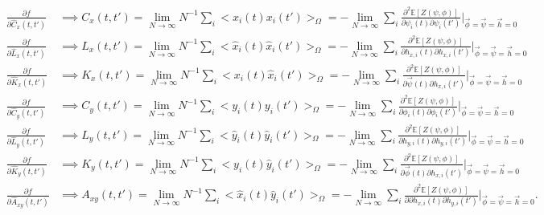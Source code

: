 \documentclass{article}
\begin{document}
\begin{align*}
	\frac{\partial f}{\partial \hat{C}_x(t, t')} &\implies C_x(t, t') = \lim_{N \rightarrow \infty}
N^{-1} \sum_i <x_i(t) x_i(t')>_\Omega = -\lim_{N \rightarrow \infty} \sum_i
\frac{\partial^2\mathbb{E}[Z(\psi, \phi)]}{\partial \psi_i(t) \partial \psi_i (t')} \bigg|_{\Vec
{\phi} = \Vec{\psi} = \Vec{h} = 0}\\
	\frac{\partial f}{\partial \hat{L}_x(t, t')} &\implies L_x(t, t') = \lim_{N \rightarrow \infty}
N^{-1} \sum_i <\hat{x}_i(t) \hat{x}_i(t')>_\Omega = -\lim_{N \rightarrow \infty} \sum_i
\frac{\partial^2\mathbb{E}[Z(\psi, \phi)]}{\partial h_{x,i}(t) \partial h_{x, i} (t')} \bigg|_{\Vec
{\phi} = \Vec{\psi} = \Vec{h} = 0}\\
	\frac{\partial f}{\partial \hat{K}_x(t, t')} &\implies K_x(t, t') = \lim_{N \rightarrow \infty}
N^{-1} \sum_i <x_i(t) \hat{x}_i(t')>_\Omega = -\lim_{N \rightarrow \infty} \sum_i
\frac{\partial^2\mathbb{E}[Z(\psi, \phi)]}{\partial \Vec{\psi}(t) \partial h_{x, i} (t')}
\bigg|_{\Vec{\phi} = \Vec{\psi} = \Vec{h} = 0}\\
\frac{\partial f}{\partial \hat{C}_y(t, t')} &\implies C_y(t, t') = \lim_{N \rightarrow \infty}
N^{-1} \sum_i <y_i(t) y_i(t')>_\Omega = -\lim_{N \rightarrow \infty} \sum_i
\frac{\partial^2\mathbb{E}[Z(\psi, \phi)]}{\partial \phi_i(t) \partial \phi_i (t')} \bigg|_{\Vec
{\phi} = \Vec{\psi} = \Vec{h} = 0}\\
	\frac{\partial f}{\partial \hat{L}_y(t, t')} &\implies L_y(t, t') = \lim_{N \rightarrow \infty}
N^{-1} \sum_i <\hat{y}_i(t) \hat{y}_i(t')>_\Omega = -\lim_{N \rightarrow \infty} \sum_i
\frac{\partial^2\mathbb{E}[Z(\psi, \phi)]}{\partial h_{y,i}(t) \partial h_{y, i} (t')} \bigg|_{\Vec
{\phi} = \Vec{\psi} = \Vec{h} = 0}\\
	\frac{\partial f}{\partial \hat{K}_y(t, t')} &\implies K_y(t, t') = \lim_{N \rightarrow \infty}
N^{-1} \sum_i <y_i(t) \hat{y}_i(t')>_\Omega = -\lim_{N \rightarrow \infty} \sum_i
\frac{\partial^2\mathbb{E}[Z(\psi, \phi)]}{\partial \Vec{\phi}(t) \partial h_{x, i} (t')}
\bigg|_{\Vec{\phi} = \Vec{\psi} = \Vec{h} = 0}\\
	\frac{\partial f}{\partial \hat{A}_{xy}(t, t')} &\implies A_{xy}(t, t') = \lim_{N \rightarrow
	\infty}
N^{-1} \sum_i <\hat{x}_i(t) \hat{y}_i(t')>_\Omega = -\lim_{N \rightarrow \infty} \sum_i
\frac{\partial^2\mathbb{E}[Z(\psi, \phi)]}{\partial \partial h_{x, i} (t) \partial h_{y, i} (t')}
\bigg|_{\Vec{\phi} = \Vec{\psi} = \Vec{h} = 0}.\\
\end{align*}
\end{document}
